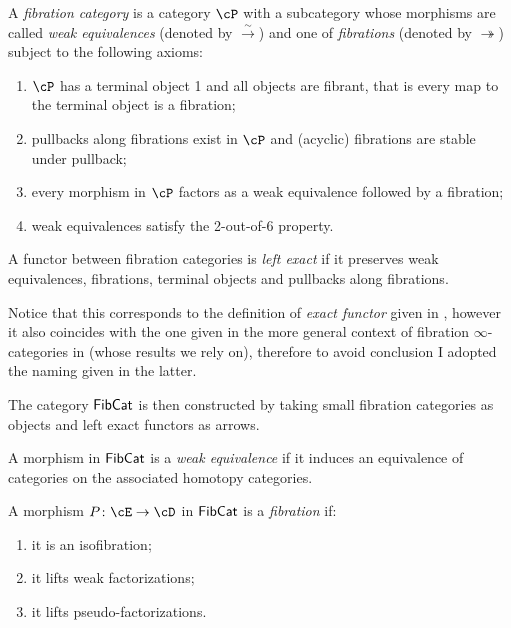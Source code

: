 \documentclass[a4paper,12pt,openany]{scrartcl}
\begin{document}
\begin{defn}
  A \emph{fibration category} is a category $\cP$ with a subcategory whose
  morphisms are called \emph{weak equivalences} (denoted by
  $\xrightarrow{\sim}$) and one of \emph{fibrations} (denoted by
  $\twoheadrightarrow$) subject to the following axioms:
  \begin{enumerate}
    \item $\cP$ has a terminal object 1 and all objects are fibrant, that is
      every map to the terminal object is a fibration;
    \item pullbacks along fibrations exist in $\cP$ and (acyclic) fibrations are
      stable under pullback;
    \item every morphism in $\cP$ factors as a weak equivalence followed by a
      fibration;
    \item weak equivalences satisfy the 2-out-of-6 property.
  \end{enumerate}
\end{defn}

\begin{defn}
  A functor between fibration categories is \emph{left exact} if it preserves weak
  equivalences, fibrations, terminal objects and pullbacks along fibrations.
\end{defn}

Notice that this corresponds to the definition of \emph{exact functor} given
in \cite[Def.\ 2.7]{KS19}, however it also coincides with the one given in the
more general context of fibration $\infty$-categories in \cite[Def.\
7.5.2]{Cis19} (whose results we rely on), therefore to avoid conclusion I
adopted the naming given in the latter.

The category $\operatorname{\mathsf{FibCat}}$ is then constructed by taking small fibration categories
as objects and left exact functors as arrows.

\begin{defn}
  A morphism in $\operatorname{\mathsf{FibCat}}$ is a \emph{weak equivalence} if it induces an
  equivalence of categories on the associated homotopy categories.
\end{defn}

\begin{defn}
  A morphism $P\colon\cE\rightarrow\cD$ in $\operatorname{\mathsf{FibCat}}$ is a \emph{fibration} if:
  \begin{enumerate}
    \item it is an isofibration;
    \item it lifts weak factorizations;
    \item it lifts pseudo-factorizations.
  \end{enumerate}
\end{defn}
\end{document}
